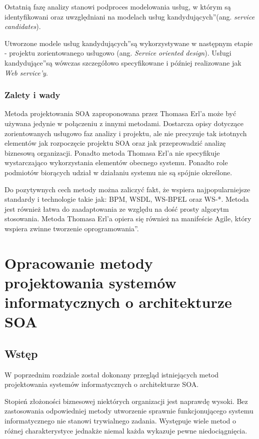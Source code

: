 Ostatnią fazę analizy stanowi podproces modelowania usług, w którym są identyfikowani oraz uwzględniani na modelach \quotedblbase usług kandydujących\textquotedblright (ang. \emph{service candidates}). \cite{CompSOAMet}

Utworzone modele \quotedblbase usług kandydujących\textquotedblright są wykorzystywane w następnym etapie - projektu zorientowanego usługowo (ang. \emph{Service oriented design}). \quotedblbase Usługi kandydujące\textquotedblright są wówczas szczegółowo specyfikowane i później realizowane jak \emph{Web service'y}.


\subsection{Zalety i wady}
Metoda projektowania SOA zaproponowana przez Thomasa Erl'a może być używana jedynie w połączeniu z innymi metodami. Dostarcza opisy dotyczące zorientowanych usługowo faz analizy i projektu, ale nie precyzuje tak istotnych elementów jak rozpoczęcie projektu SOA oraz jak przeprowadzić analizę biznesową organizacji. Ponadto metoda Thomasa Erl'a nie specyfikuje wystarczająco wykorzystania elementów obecnego systemu. Ponadto role podmiotów biorących udział w działaniu systemu nie są spójnie określone.

Do pozytywnych cech metody można zaliczyć fakt, że wspiera najpopularniejsze standardy i technologie takie jak: BPM, WSDL, WS-BPEL oraz WS-*. Metoda jest również łatwa do zaadaptowania ze względu na dość prosty algorytm stosowania. Metoda Thomasa Erl'a opiera się również na manifeście Agile, który wspiera \quotedblbase zwinne tworzenie oprogramowania\textquotedblright. \cite{OffCompSOAM, RamErvSOA}

\chapter{Opracowanie metody projektowania systemów informatycznych o architekturze SOA}
\section{Wstęp}
W poprzednim rozdziale został dokonany przegląd istniejących metod projektowania systemów informatycznych o architekturze SOA.

Stopień złożoności biznesowej niektórych organizacji jest naprawdę wysoki. Bez zastosowania odpowiedniej metody utworzenie sprawnie funkcjonującego systemu informatycznego nie stanowi trywialnego zadania. Występuje wiele metod o różnej charakterystyce jednakże niemal każda wykazuje pewne niedociągnięcia.

